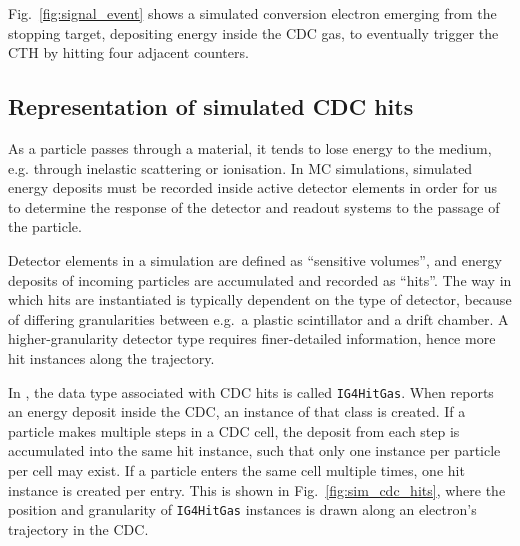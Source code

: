 Fig.~\ref{fig:signal_event} shows a simulated conversion electron emerging from the stopping target, depositing energy inside the CDC gas, to eventually trigger the CTH by hitting four adjacent counters. 

\subsection{Representation of simulated CDC hits}\label{subsec:SD}
As a particle passes through a material, it tends to lose energy to the medium, e.g. through inelastic scattering or ionisation. 
In MC simulations, simulated energy deposits must be recorded inside active detector elements in order for us to determine the response of the detector and readout systems to the passage of the particle.

Detector elements in a \Geant simulation are defined as ``sensitive volumes'', and energy deposits of incoming particles are accumulated and recorded as ``hits''. 
The way in which hits are instantiated is typically dependent on the type of detector, because of differing granularities between e.g.\ a plastic scintillator and a drift chamber. A higher-granularity detector type requires finer-detailed information, hence more hit instances along the trajectory.

In \SimG, the data type associated with CDC hits is called \texttt{IG4HitGas}. When \Geant reports an energy deposit inside the CDC, an instance of that class is created. If a particle makes multiple steps in a CDC cell, the deposit from each step is accumulated into the same hit instance, such that only one instance per particle per cell may exist. If a particle enters the same cell multiple times, one hit instance is created per entry.
This is shown in Fig.~\ref{fig:sim_cdc_hits}, where the position and granularity of \texttt{IG4HitGas} instances is drawn along an electron's trajectory in the CDC.




